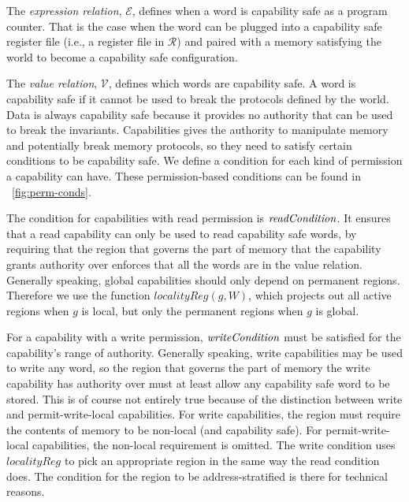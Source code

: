 \documentclass[compsoc,conference,letterpaper,fleqn]{IEEEtran}
\newcommand{\var}[1]{\mathit{#1}}
\newcommand{\plainfun}[2]{
  \ifthenelse{\equal{#2}{}}
  {\mathit{#1}}
  {\mathit{#1}(#2)}
}
\newcommand{\readCond}[1]{\plainfun{readCondition}{#1}}
\newcommand{\writeCond}[1]{\plainfun{writeCondition}{#1}}
\newcommand{\asmType}{\plaindom{AsmType}}
\newcommand{\plaindom}[1]{\mathrm{#1}}
\newcommand{\intr}[2]{\mathcal{#1}}
\newcommand{\valueintr}[1]{\intr{V}{#1}}
\newcommand{\exprintr}[1]{\intr{E}{#1}}
\newcommand{\regintr}[1]{\intr{R}{#1}}
\newcommand{\stdvr}{\valueintr{\asmType}}
\newcommand{\stder}{\exprintr{\asmType}}
\newcommand{\stdrr}{\regintr{\asmType}}
\begin{document}
The \emph{expression relation}, $\stder$, defines when a word is
capability safe as a program counter. That is the case when the word can be plugged into a
capability safe register file (i.e., a register file in $\stdrr$) and
paired with a memory satisfying the world to become a capability safe
configuration.

The \emph{value relation}, $\stdvr$, defines which words are capability
safe. A word is capability safe if it cannot be used to break the
protocols defined by the world. Data is always capability safe because
it provides no authority that can be used to break the
invariants. Capabilities gives the authority to manipulate memory and
potentially break memory protocols, so they need to satisfy certain
conditions to be capability safe. We define a condition for each kind
of permission a capability can have. These permission-based conditions
can be found in \figurename~\ref{fig:perm-conds}. 

The condition for capabilities with read permission is
$\readCond{}$. It ensures that a read capability can only be used to
read capability safe words, by requiring that the region that governs
the part of memory that the capability grants authority over enforces
that all the words are in the value relation. Generally speaking,
global capabilities should only depend on permanent regions. Therefore
we use the function $\var{localityReg}(g,W)$, which projects out all
active regions when $g$ is local, but only the permanent regions when
$g$ is global.

For a capability with a write permission, $\writeCond{}$ must be
satisfied for the capability's range of authority. Generally speaking,
write capabilities may be used to write any word, so the region that
governs the part of memory the write capability has authority over
must at least allow any capability safe word to be stored.
This is of course not entirely true because of the distinction between
write and permit-write-local capabilities. For write capabilities, the
region must require the contents of memory to be non-local (and
capability safe). For permit-write-local capabilities, the
non-local requirement is omitted.
The write condition uses $\var{localityReg}$ to pick an appropriate
region in the same way the read condition does.
The condition for the region to be address-stratified is there for
technical reasons.
\end{document}
